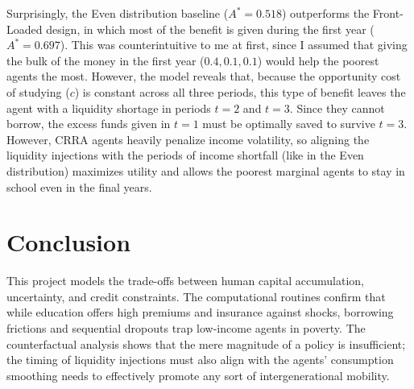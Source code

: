 \documentclass[11pt]{article}
\numberwithin{equation}{section}
\numberwithin{figure}{section}
\begin{document}
\vspace{-0.3cm}

Surprisingly, the Even distribution baseline ($A^* = 0.518$) outperforms the Front-Loaded design, in which most of the benefit is given during the first year ($A^* = 0.697$). This was counterintuitive to me at first, since I assumed that giving the bulk of the money in the first year ($0.4, 0.1, 0.1$) would help the poorest agents the most. However, the model reveals that, because the opportunity cost of studying ($c$) is constant across all three periods, this type of benefit leaves the agent with a liquidity shortage in periods $t=2$ and $t=3$. Since they cannot borrow, the excess funds given in $t=1$ must be optimally saved to survive $t=3$. However, CRRA agents heavily penalize income volatility, so aligning the liquidity injections with the periods of income shortfall (like in the Even distribution) maximizes utility and allows the poorest marginal agents to stay in school even in the final years.

\vspace{-0.3cm}

\section{Conclusion}
This project models the trade-offs between human capital accumulation, uncertainty, and credit constraints. The computational routines confirm that while education offers high premiums and insurance against shocks, borrowing frictions and sequential dropouts trap low-income agents in poverty. The counterfactual analysis shows that the mere magnitude of a policy is insufficient; the timing of liquidity injections must also align with the agents' consumption smoothing needs to effectively promote any sort of intergenerational mobility.
\end{document}
